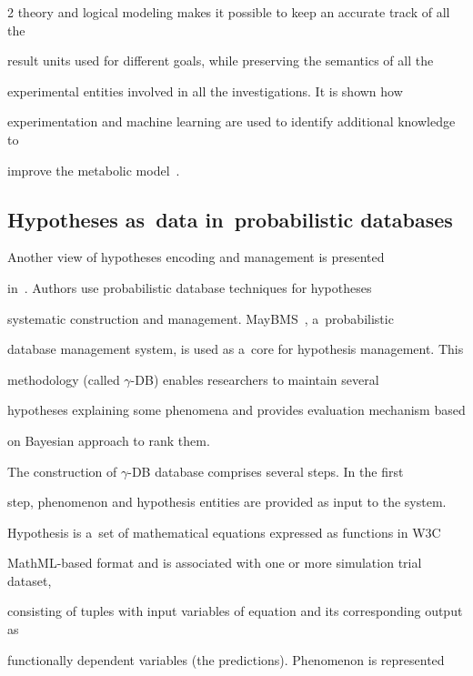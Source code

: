 \begin{multicols}{2}
theory and logical modeling makes it possible to keep an accurate track of all the


result units used for different goals, while preserving the semantics of all the


experimental entities involved in all the investigations. It is shown how


experimentation and machine learning are used to identify additional knowledge to


improve the metabolic model~\cite{54-kl}.





\subsection{Hypotheses as~data in~probabilistic databases}





\noindent


  Another view of hypotheses encoding and management is presented


  in~\cite{55-kl}. Authors use probabilistic database techniques for hypotheses


systematic construction and management. MayBMS~\cite{56-kl}, a~probabilistic


database management system, is used as a~core for hypothesis management. This


methodology (called $\gamma$-DB) enables researchers to maintain several


hypotheses explaining some phenomena and provides evaluation mechanism based


on Bayesian approach to rank them.





  The construction of $\gamma$-DB database comprises several steps. In the first


step, phenomenon and hypothesis entities are provided as input to the system.


Hypothesis is a~set of mathematical equations expressed as functions in W3C


MathML-based format and is associated with one or more simulation trial dataset,


consisting of tuples with input variables of equation and its corresponding output as


functionally dependent variables (the predictions). Phenomenon is represented



\end{multicols}
